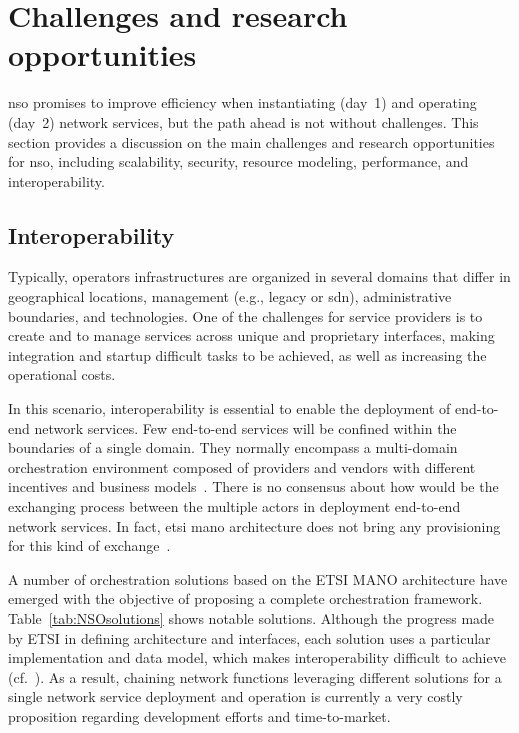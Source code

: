 \section{Challenges and research opportunities}
\label{sec:challenge}

\gls{nso} promises to improve efficiency when instantiating (day~1) and operating (day~2) network services, but the path ahead is not without  challenges. 
This section provides a discussion on the main challenges and research opportunities for \gls{nso}, including scalability, security, resource modeling, performance, and interoperability.

\subsection{Interoperability}

Typically, operators infrastructures are organized in several domains that differ in geographical locations, management (e.g., legacy or \gls{sdn}), administrative boundaries, and technologies. One of the challenges for service providers is to create and to manage services across unique and proprietary interfaces, making integration and startup difficult tasks to be achieved, as well as increasing the operational costs.  

In this scenario, interoperability is essential to enable the deployment of end-to-end network services. Few end-to-end services will be confined within the boundaries of a single domain. They normally encompass a multi-domain orchestration environment composed of providers and vendors with different incentives and business models~\cite{Katsalis2016Multi-DomainDirections}. There is no consensus about how would be the exchanging process between the multiple actors in deployment end-to-end network services. In fact, \gls{etsi} \gls{mano} architecture does not bring any provisioning for this kind of exchange~\cite{ETSIIndustrySpecificationGroupISGNFV2014NetworkNFV}. 

A number of orchestration solutions based on the ETSI MANO architecture have emerged with the objective of proposing a complete orchestration framework. Table~\ref{tab:NSOsolutions} shows notable solutions. Although the progress made by ETSI in defining architecture and interfaces, each solution uses a particular implementation and data model, which makes interoperability difficult to achieve (cf.~\cite{NOn}). As a result, chaining network functions leveraging different solutions for a single network service deployment and operation is currently a very costly proposition regarding development efforts and time-to-market.   

